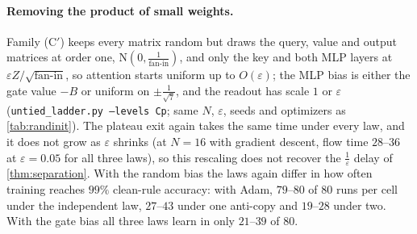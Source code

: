 \paragraph{Removing the product of small weights.} Family (C$'$) keeps every matrix random but draws the query, value and output matrices at order one,
$\mathrm N(0,\tfrac{1}{\text{fan-in}})$, and only the key and both MLP layers at $\varepsilon Z/\sqrt{\text{fan-in}}$, so attention starts uniform up to $O(\varepsilon)$;
the MLP bias is either the gate value $-B$ or uniform on $\pm\tfrac{1}{\sqrt7}$, and the readout has scale $1$ or $\varepsilon$
(\texttt{untied\_ladder.py --levels Cp}; same $N$, $\varepsilon$, seeds and optimizers as \cref{tab:randinit}). The plateau exit again takes the same time under
every law, and it does not grow as $\varepsilon$ shrinks (at $N=16$ with gradient descent, flow time $28$--$36$ at $\varepsilon=0.05$ for all three laws), so this rescaling does not
recover the $\tfrac{1}{\varepsilon}$ delay of \cref{thm:separation}. With the random bias the laws again differ in how often training reaches $99\%$ clean-rule accuracy:
with Adam, $79$--$80$ of $80$ runs per cell under the independent law, $27$--$43$ under one anti-copy and $19$--$28$ under two. With the gate bias all three laws learn
in only $21$--$39$ of $80$.

\begin{table}[t]
\centering\small
\caption{\textbf{Fully random initialization, every matrix entry trained.} Anti-copy law, $\eta=0.1$, binary cross-entropy, ten seeds per initialization.
Each cell: runs reaching $99\%$ clean-rule accuracy within the budget; Adam pools eight initializations, gradient descent the four with $\varepsilon\ge0.5$.}
\label{tab:randinit}

\end{table}

\begin{table}[t]
\centering\small
\caption{\textbf{Untied one-block training under the anti-copy law.} Every matrix entry trains; binary cross-entropy, $N=16$, $\eta=0.1$.
Each cell: seeds (of three) reaching $99\%$ clean-rule accuracy within gradient-flow time $3\times10^4$, and their median time.
$\kappa=1$: independent decoys; $\kappa=0$: one anti-copy; $\kappa=-1$: two anti-copies.}
\label{tab:untied}
\fitwidth{}
\end{table}
